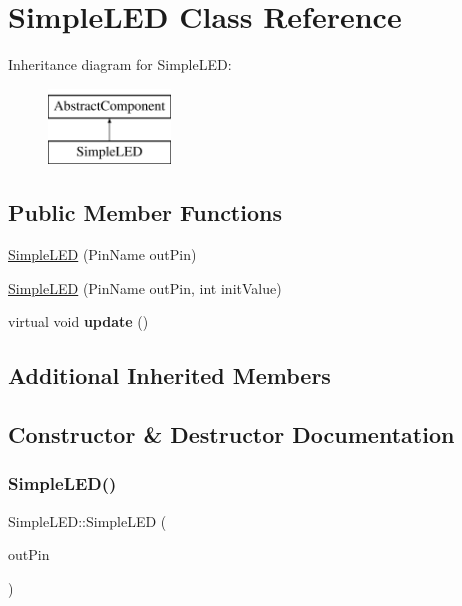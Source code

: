 \hypertarget{class_simple_l_e_d}{}\section{Simple\+L\+ED Class Reference}
\label{class_simple_l_e_d}
Inheritance diagram for Simple\+L\+ED\+:\begin{figure}[H]
\begin{center}
\leavevmode
\includegraphics[height=2.000000cm]{class_simple_l_e_d}
\end{center}
\end{figure}
\subsection*{Public Member Functions}
\begin{DoxyCompactItemize}
\item 
\hyperlink{class_simple_l_e_d_afec6f532dbc735f2fd95a2d080e7398d}{Simple\+L\+ED} (Pin\+Name out\+Pin)
\item 
\hyperlink{class_simple_l_e_d_a035610e281499c6a1160b2ae6b2797f0}{Simple\+L\+ED} (Pin\+Name out\+Pin, int init\+Value)
\item 
\mbox{\label{class_simple_l_e_d_a1642dc4aca42ad46e5663a39cdda005f}} 
virtual void {\bfseries update} ()
\end{DoxyCompactItemize}
\subsection*{Additional Inherited Members}


\subsection{Constructor \& Destructor Documentation}
\mbox{\label{class_simple_l_e_d_afec6f532dbc735f2fd95a2d080e7398d}} 
\subsubsection{\texorpdfstring{Simple\+L\+E\+D()}{SimpleLED()}\hspace{0.1cm}{\footnotesize\ttfamily [1/2]}}
{\footnotesize\ttfamily Simple\+L\+E\+D\+::\+Simple\+L\+ED (\begin{DoxyParamCaption}\item[{Pin\+Name}]{out\+Pin }\end{DoxyParamCaption})}

